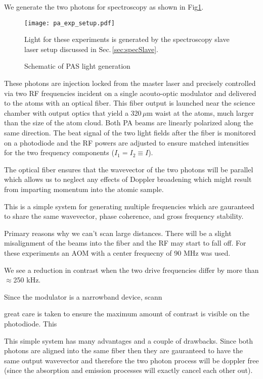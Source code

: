  
We generate the two photons for spectroscopy as shown in Fig\ref{fig:pas_light_gen}.
	\begin{figure} \label{fig:pas_light_gen}
		\centerline{
		\texttt{[image: pa\_exp\_setup.pdf]}}
		\caption{Schematic of PAS light generation}{Light for these experiments is generated by the spectroscopy slave laser setup discussed in Sec.\,\ref{sec:specSlave}.}
	\end{figure} 
These photons are injection locked from the master laser and precisely controlled via two RF frequencies incident on a single acouto-optic modulator and delivered to the atoms with an optical fiber.
This fiber output is launched near the science chamber with output optics that yield a 320\,$\mu$m waist at the atoms, much larger than the size of the atom cloud.
Both PA beams are linearly polarized along the same direction.
The beat signal of the two light fields after the fiber is monitored on a photodiode and the RF powers are adjusted to ensure matched intensities for the two frequency components ($I_1=I_2\equiv I$).


The optical fiber ensures that the wavevector of the two photons will be parallel which allows us to neglect any effects of Doppler broadening which might result from imparting momentum into the atomic sample.
 
This is a simple system for generating multiple frequencies which are gauranteed to share the same wavevector, phase coherence, and gross frequency stability. 

Primary reasons why we can't scan large distances. 
There will be a slight misalignment of the beams into the fiber and the RF may start to fall off. 
For these experiments an AOM with a center frequecny of 90 MHz was used. 

We see a reduction in contrast when the two drive frequencies differ by more than $\approx$250 kHz. 

Since the modulator is a narrowband device, scann

great care is taken to ensure the maximum amount of contrast is visible on the photodiode. This 




This simple system has many advantages and a couple of drawbacks. 
Since both photons are aligned into the same fiber then they are gauranteed to have the same output wavevector and therefore the two photon process will be doppler free (since the absorption and emission processes will exactly cancel each other out).


